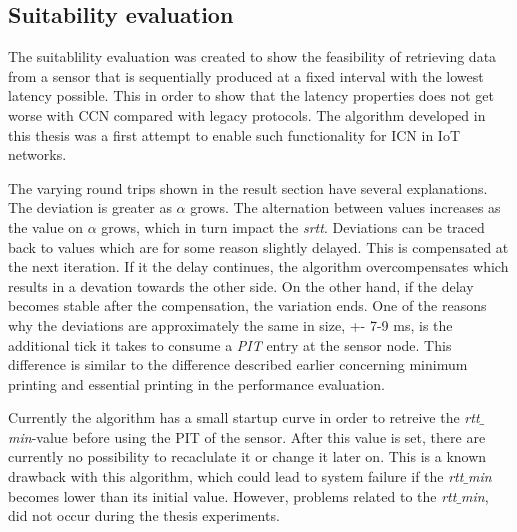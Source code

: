 \subsection{Suitability evaluation}
The suitablility evaluation was created to show the feasibility of retrieving data from a sensor that is sequentially produced at a fixed interval with the lowest latency possible. This in order to show that the latency properties does not get worse with CCN compared with legacy protocols. The algorithm developed in this thesis was a first attempt to enable such functionality for ICN in IoT networks.

The varying round trips shown in the result section have several explanations. The deviation is greater as $\alpha$ grows. 
The alternation between values increases as the value on $\alpha$ grows, which in turn impact the \textit{srtt}. 
Deviations can be traced back to values which are for some reason slightly delayed. This is compensated at the next iteration. If it the delay continues, the algorithm overcompensates which results in a devation towards the other side. On the other hand, if the delay becomes stable after the compensation, the variation ends.
One of the reasons why the deviations are approximately the same in size, +- 7-9 ms, is the additional tick it takes to consume a \textit{PIT} entry at the sensor node. This difference is similar to the difference described earlier concerning minimum printing and essential printing in the performance evaluation.

Currently the algorithm has a small startup curve in order to retreive the \textit{rtt$\_$min}-value before using the PIT of the sensor. After this value is set, there are currently no possibility to recaclulate it or change it later on. This is a known drawback with this algorithm, which could lead to system failure if the \textit{rtt$\_$min} becomes lower than its initial value. However, problems related to the \textit{rtt$\_$min}, did not occur during the thesis experiments.

